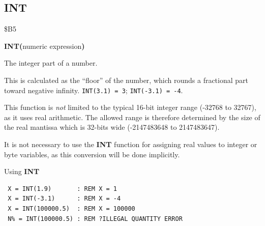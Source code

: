 
\newpage
\subsection{INT}
\begin{description}[leftmargin=2cm,style=nextline]
\item [Token:]    \$B5

\item [Format:]   {\bf INT(}numeric expression{\bf)}

\item [Returns:]  The integer part of a number.

                  This is calculated as the ``floor'' of the number, which rounds a fractional part toward negative infinity. \texttt{INT(3.1) = 3}; \texttt{INT(-3.1) = -4}.

                  This function is \emph{not} limited to the typical 16-bit integer range (-32768 to 32767), as it uses real arithmetic. The allowed range is therefore determined by the size of the real mantissa which is 32-bits wide (-2147483648 to 2147483647).

\item [Remarks:]  It is not necessary to use the {\bf INT} function for assigning real values to integer or byte variables, as this conversion will be done implicitly.

\item [Examples:] Using {\bf INT}

\begin{tcolorbox}[colback=black,coltext=white]
\verbatimfont{\codefont}
\begin{verbatim}
 X = INT(1.9)       : REM X = 1
 X = INT(-3.1)      : REM X = -4
 X = INT(100000.5)  : REM X = 100000
 N% = INT(100000.5) : REM ?ILLEGAL QUANTITY ERROR
\end{verbatim}
\end{tcolorbox}
\end{description}


\newpage
